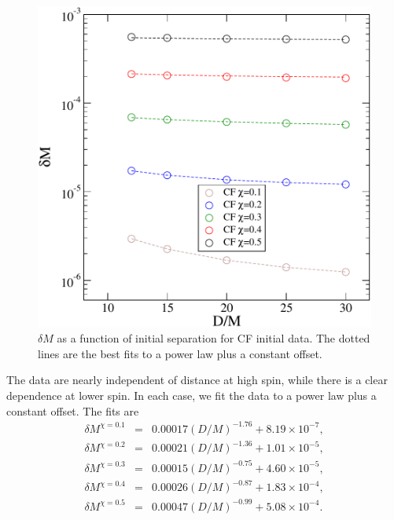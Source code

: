 \begin{figure}[!htbp]
\includegraphics[scale=0.95]{chap5/MvsD2}
\caption[$\delta M$ vs. $D$ for CF initial data.]{$\delta M$ as a function of initial separation for
  CF initial data. The dotted lines are the best fits to a power law
  plus a constant offset.}
\label{fig:MvsD}
\end{figure}

The data are nearly independent of distance at high spin, while there
is a clear dependence at lower spin. In each case, we fit the data to
a power law plus a constant offset. The fits are
\begin{eqnarray*}
\delta M^{\chi = 0.1} &=&
0.00017\left(D/M\right)^{-1.76}+8.19\times 10^{-7}, \\
\delta M^{\chi = 0.2} &=&
0.00021\left(D/M\right)^{-1.36}+1.01\times 10^{-5}, \\
\delta M^{\chi = 0.3} &=&
0.00015\left(D/M\right)^{-0.75}+4.60\times 10^{-5}, \\
\delta M^{\chi = 0.4} &=&
0.00026\left(D/M\right)^{-0.87}+1.83\times 10^{-4}, \\
\delta M^{\chi = 0.5} &=&
0.00047\left(D/M\right)^{-0.99}+5.08\times 10^{-4}. 
\end{eqnarray*}

